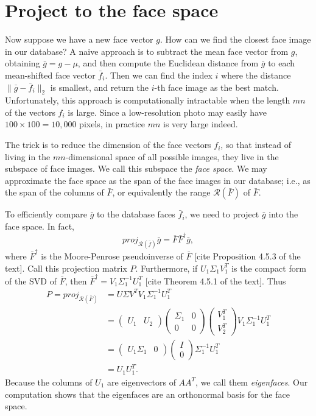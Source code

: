 \section*{Project to the face space}
Now suppose we have a new face vector $g$. 
How can we find the closest face image in our database?
A naive approach is to subtract the mean face vector from $g$, obtaining $\bar{g} = g-\mu$, and then compute the Euclidean distance from $\bar{g}$ to each mean-shifted face vector $\bar{f}_i$.
Then we can find the index $i$ where the distance $\|\bar{g}-\bar{f}_i\|_2$ is smallest, and return the $i$-th face image as the best match.
Unfortunately, this approach is computationally intractable when the length $mn$ of the vectors $f_i$ is large.
Since a low-resolution photo may easily have $100\times 100 = 10,000$ pixels, in practice $mn$ is very large indeed.

The trick is to reduce the dimension of the face vectors $f_i$, so that instead of living in the $mn$-dimensional space of all possible images, they live in the subspace of face images.
We call this subspace the \emph{face space}.
We may approximate the face space as the span of the face images in our database; i.e., as the span of the columns of $\bar{F}$, or equivalently the range $\mathscr{R}(\bar{F})$ of $\bar{F}$.

To efficiently compare $\bar{g}$ to the database faces $\bar{f}_i$, we need to project $\bar{g}$ into the face space. In fact,
\[
proj_{\mathscr{R}(\bar{f})} \bar{g} = \overline{F}\bar{F}^{\dagger}\bar{g},
\]
where $\bar{F}^{\dagger}$ is the Moore-Penrose pseudoinverse of $\bar{F}$ [cite Proposition 4.5.3 of the text].
 Call this projection matrix $P$. 
 Furthermore, if $U_1\Sigma_1V_1^T$ is the compact form of the SVD of $\bar{F}$, then $\bar{F}^{\dagger} = V_1\Sigma_1^{-1}U_1^T$ [cite Theorem 4.5.1 of the text]. 
 Thus
\begin{align*}
P = proj_{\mathscr{R}(\bar{F})} &= U \Sigma V^T V_1\Sigma_1^{-1}U_1^T\\
&= \begin{pmatrix}
U_1 & U_2
\end{pmatrix} \begin{pmatrix}
\Sigma_1 & 0\\
0 & 0 
\end{pmatrix} \begin{pmatrix}
V_1^T \\
V_2^T
\end{pmatrix} V_1\Sigma_1^{-1}U_1^T\\
&= \begin{pmatrix}
U_1\Sigma_1 & 0
\end{pmatrix} \begin{pmatrix}
I \\
0
\end{pmatrix}\Sigma_1^{-1}U_1^T\\
&= U_1U_1^T.
\end{align*}
Because the columns of $U_1$ are eigenvectors of $AA^T$, we call them \emph{eigenfaces}.
Our computation shows that the eigenfaces are an orthonormal basis for the face space.

